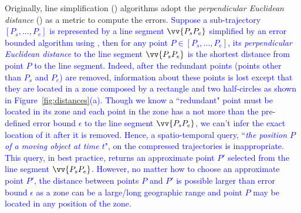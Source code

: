 Originally, line simplification (\lsa) algorithms adopt the \emph{perpendicular Euclidean distance} (\ped) as a metric to compute the errors.
\textcolor{blue}{Suppose a sub-trajectory $[P_s, ..., P_e]$ is represented by a line segment $\vv{P_sP_e}$  simplified by an error bounded \lsa algorithm using \ped, then for any point $P \in [P_s, ..., P_e]$, its \emph{perpendicular Euclidean distance} to the line segment $\vv{P_sP_e}$  is the shortest distance from point $P$ to the line segment.}
\textcolor{blue}{Indeed, after the redundant points (points other than $P_s$ and $P_e$) are removed, information about these points is lost except that they are located in a zone composed by a rectangle and two half-circles as shown in Figure~\ref{fig:distances}(a).}
\textcolor{blue}{Though we know a ``redundant" point must be located in its zone and each point in the zone has a \ped not more than the pre-defined error bound $\epsilon$ to the line segment $\vv{P_sP_e}$, we can't infer the exact location of it after it is removed.}
%
\textcolor{blue}{Hence, a spatio-temporal query, \eg ``\emph{the position $P$ of a moving object at time $t$}", on the compressed trajectories is inappropriate. This query, in best practice, returns an approximate point $P'$ selected from the line segment $\vv{P_sP_e}$. However, no matter how to choose an approximate point $P'$, the distance between points $P$ and $P'$ is possible larger than error bound $\epsilon$ as a zone can be a large/long geographic range and point $P$ may be located in any position of the zone.}
%





